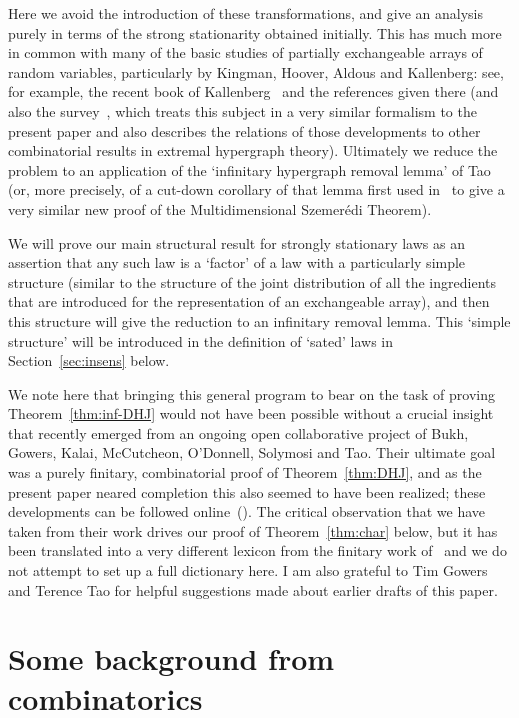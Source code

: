\documentclass[11pt]{article}
\begin{document}
Here we avoid the introduction of these transformations, and give an
analysis purely in terms of the strong stationarity obtained
initially. This has much more in common with many of the basic
studies of partially exchangeable arrays of random variables,
particularly by Kingman, Hoover, Aldous and Kallenberg: see, for
example, the recent book of Kallenberg~\cite{Kal05} and the
references given there (and also the survey~\cite{Aus--ERH}, which
treats this subject in a very similar formalism to the present paper
and also describes the relations of those developments to other
combinatorial results in extremal hypergraph theory).  Ultimately we
reduce the problem to an application of the `infinitary hypergraph
removal lemma' of Tao~\cite{Tao07} (or, more precisely, of a
cut-down corollary of that lemma first used
in~\cite{Aus--newmultiSzem} to give a very similar new proof of the
Multidimensional Szemer\'edi Theorem).

We will prove our main structural result for strongly stationary
laws as an assertion that any such law is a `factor' of a law with a
particularly simple structure (similar to the structure of the joint
distribution of all the ingredients that are introduced for the
representation of an exchangeable array), and then this structure
will give the reduction to an infinitary removal lemma. This `simple
structure' will be introduced in the definition of `sated' laws in
Section~\ref{sec:insens} below.

We note here that bringing this general program to bear on the task
of proving Theorem~\ref{thm:inf-DHJ} would not have been possible
without a crucial insight that recently emerged from an ongoing open
collaborative project of Bukh, Gowers, Kalai, McCutcheon, O'Donnell,
Solymosi and Tao.  Their ultimate goal was a purely finitary,
combinatorial proof of Theorem~\ref{thm:DHJ}, and as the present
paper neared completion this also seemed to have been realized;
these developments can be followed online~(\cite{Gow(online)}). The
critical observation that we have taken from their work drives our
proof of Theorem~\ref{thm:char} below, but it has been translated
into a very different lexicon from the finitary work
of~\cite{Gow(online)} and we do not attempt to set up a full
dictionary here.  I am also grateful to Tim Gowers and Terence Tao
for helpful suggestions made about earlier drafts of this paper.

\section{Some background from combinatorics}\label{sec:comb-bac}
\end{document}
